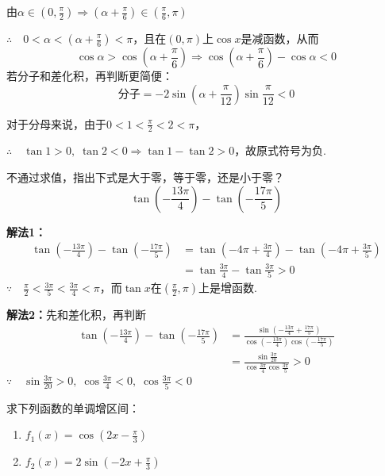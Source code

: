 \begin{solution}
由$\alpha\in\left(0,\frac{\pi}{2}\right)\Rightarrow \left(\alpha+\frac{\pi}{6}\right)\in \left(\frac{\pi}{6},\pi\right)$

$\therefore\quad 0<\alpha<\left(\alpha+\frac{\pi}{6}\right)<\pi$，且在$(0,\pi)$上$\cos x$是减函数，从而
\[\cos\alpha>\cos\left(\alpha+\frac{\pi}{6}\right) \Longrightarrow \cos\left(\alpha+\frac{\pi}{6}\right)-\cos\alpha<0\]
若分子和差化积，再判断更简便：
\[\text{分子}=-2\sin\left(\alpha+\frac{\pi}{12}\right)\sin\frac{\pi}{12}<0\]

对于分母来说，由于$0<1<\frac{\pi}{2}<2<\pi$，

$\therefore\quad \tan 1>0,\; \tan 2<0 \Rightarrow \tan1-\tan 2>0$，故原式符号为负.
\end{solution}

\begin{example}
不通过求值，指出下式是大于零，等于零，还是小于零？
\[\tan\left(-\frac{13\pi}{4}\right)-\tan\left(-\frac{17\pi}{5}\right)\]
\end{example}


\begin{solution}
\textbf{解法1：}
\[\begin{split}
    \tan\left(-\frac{13\pi}{4}\right)-\tan\left(-\frac{17\pi}{5}\right)&=\tan\left(-4\pi+\frac{3\pi}{4}\right)-\tan\left(-4\pi+\frac{3\pi}{5}\right)\\
    &=\tan\frac{3\pi}{4}-\tan\frac{3\pi}{5}>0
\end{split}\]
$\because\quad \frac{\pi}{2}<\frac{3\pi}{5}<\frac{3\pi}{4}<\pi$，而$\tan x$在$\left(\frac{\pi}{2},\pi\right)$上是增函数.

\textbf{解法2：}先和差化积，再判断
\[\begin{split}
    \tan\left(-\frac{13\pi}{4}\right)-\tan\left(-\frac{17\pi}{5}\right)&=\frac{\sin\left(-\frac{13\pi}{4}+\frac{17\pi}{5}\right)}{\cos\left(-\frac{13\pi}{4}\right)\cos\left(-\frac{17\pi}{5}\right)}\\
    &=\frac{\sin\frac{3\pi}{20}}{\cos\frac{3\pi}{4}\cos\frac{3\pi}{5}}>0
\end{split}\]
$\because\quad \sin\frac{3\pi}{20}>0,\; \cos\frac{3\pi}{4}<0,\; \cos\frac{3\pi}{5}<0$
\end{solution}

\begin{example}
求下列函数的单调增区间：
\begin{multicols}{2}
\begin{enumerate}[(1)]
    \item $f_1(x)=\cos\left(2x-\frac{\pi}{3}\right)$
    \item $f_2(x)=2\sin\left(-2x+\frac{\pi}{3}\right)$
\end{enumerate}
\end{multicols}
\end{example}

